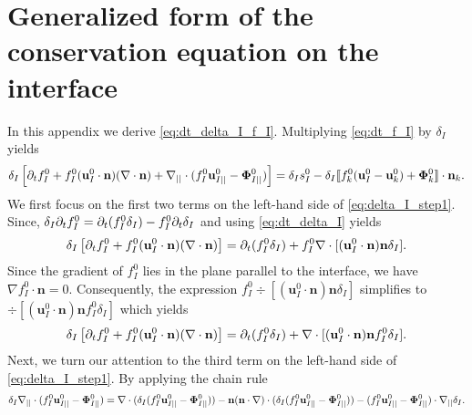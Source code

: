 \section{Generalized form of the conservation equation on the interface}
\label{ap:interface_proof}
In this appendix we derive \ref{eq:dt_delta_I_f_I}. Multiplying \ref{eq:dt_f_I} by $\delta_I$ yields
\begin{equation}
    \delta_I
    \left[ \partial_t f_I^0 
    + f_I^0 (\textbf{u}_{I}^0\cdot \textbf{n})  (\mathbf{\nabla}\cdot \textbf{n})
    +\mathbf{\nabla}_{||}\cdot
    (f_I^0 \textbf{u}_{I||}^0
    - \mathbf{\Phi}_{I||}^0 )
    \right]
    = \delta_Is_I^0
    - \delta_I\llbracket 
    f_k^0 (\textbf{u}_I^0 - \textbf{u}_k^0)
    + \mathbf{\Phi}_k^0 \rrbracket \cdot \textbf{n}_k.
    \label{eq:delta_I_step1}
\end{equation}
We first focus on the first two terms on the left-hand side of \ref{eq:delta_I_step1}. Since, $\delta_I\partial_t f_I^0 = \partial_t (f_I^0\delta_I) - f_I^0\partial_t\delta_I$ and using \ref{eq:dt_delta_I} yields
\begin{equation}
\delta_I
    \left[ \partial_t f_I^0 
    + f_I^0 (\textbf{u}_{I}^0\cdot \textbf{n})  (\mathbf{\nabla}\cdot \textbf{n}) \right] = \partial_t (f_I^0\delta_I) + f_I^0\mathbf{\nabla}\cdot [(\textbf{u}_I^0\cdot \textbf{n}) \textbf{n}\delta_I ].
\end{equation}
Since the gradient of $f_I^0$ lies in the plane parallel to the interface, we have  $\nabla f_I^0 \cdot \textbf{n} = 0$. Consequently, the expression $f_I^0\div [(\textbf{u}_I^0\cdot \textbf{n}) \textbf{n}\delta_I ]$ simplifies to $\div [(\textbf{u}_I^0\cdot \textbf{n}) \textbf{n}f_I^0\delta_I ]$ which yields 
\begin{equation}
\delta_I
    \left[ \partial_t f_I^0 
    + f_I^0 (\textbf{u}_{I}^0\cdot \textbf{n})  (\mathbf{\nabla}\cdot \textbf{n}) \right] = \partial_t (f_I^0\delta_I) + \mathbf{\nabla}\cdot [(\textbf{u}_I^0\cdot \textbf{n}) \textbf{n}f_I^0\delta_I ].
\label{eq:delta_I_step1_2}
\end{equation}
Next, we turn our attention to the third term on the left-hand side of \ref{eq:delta_I_step1}. By applying the chain rule
\begin{equation}
    \delta_I \divI (f_I^0 \textbf{u}_{I||}^0
    - \mathbf{\Phi}_{I||}^0 ) %
    = 
    \div (\delta_I (f_I^0 \textbf{u}_{I||}^0
    - \mathbf{\Phi}_{I||}^0 ))
    - \textbf{n}(\textbf{n}\cdot\grad)\cdot (\delta_I (f_I^0 \textbf{u}_{I||}^0
    - \mathbf{\Phi}_{I||}^0 ))
    - (f_I^0 \textbf{u}_{I||}^0
    - \mathbf{\Phi}_{I||}^0 )\cdot\gradI\delta_I.
\label{eq:delta_I_step2}
\end{equation}
